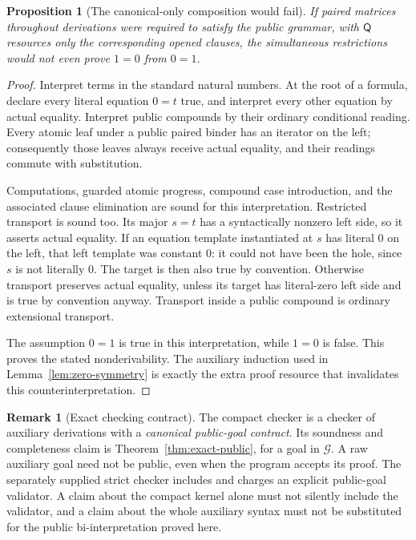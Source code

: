 \documentclass[11pt,letterpaper]{article}
\newtheorem{proposition}[theorem]{Proposition}
\theoremstyle{definition}
\newtheorem{remark}[theorem]{Remark}
\newcommand{\Q}{\mathsf Q}
\newcommand{\G}{\mathcal G}
\begin{document}
\begin{proposition}[The canonical-only composition would fail]
If paired matrices throughout derivations were required to satisfy the
public grammar, with $\Q$ resources only the corresponding opened
clauses, the simultaneous restrictions would not even prove $1=0$ from
$0=1$.
\end{proposition}
\begin{proof}
Interpret terms in the standard natural numbers.  At the root of a
formula, declare every literal equation $0=t$ true, and interpret every
other equation by actual equality.  Interpret public compounds by their
ordinary conditional reading.  Every atomic leaf under a public paired
binder has an iterator on the left; consequently those leaves always
receive actual equality, and their readings commute with substitution.

Computations, guarded atomic progress, compound case introduction,
and the associated clause elimination are sound for this interpretation.
Restricted transport is sound too.  Its major $s=t$ has a syntactically
nonzero left side, so it asserts actual equality.  If an equation
template instantiated at $s$ has literal $0$ on the left, that left
template was constant $0$: it could not have been the hole, since
$s$ is not literally $0$.  The target is then also true by convention.
Otherwise transport preserves actual equality, unless its target has
literal-zero left side and is true by convention anyway.  Transport
inside a public compound is ordinary extensional transport.

The assumption $0=1$ is true in this interpretation, while $1=0$ is
false.  This proves the stated nonderivability.  The auxiliary induction
used in Lemma~\ref{lem:zero-symmetry} is exactly the extra proof resource
that invalidates this counterinterpretation.
\end{proof}

\begin{remark}[Exact checking contract]
The compact checker is a checker of auxiliary derivations with a
\emph{canonical public-goal contract}.  Its soundness and completeness
claim is Theorem~\ref{thm:exact-public}, for a goal in $\G$.  A raw
auxiliary goal need not be public, even when the program accepts its
proof.  The separately supplied strict checker includes and charges an
explicit public-goal validator.  A claim about the compact kernel alone
must not silently include the validator, and a claim about the whole
auxiliary syntax must not be substituted for the public bi-interpretation
proved here.
\end{remark}
\end{document}
